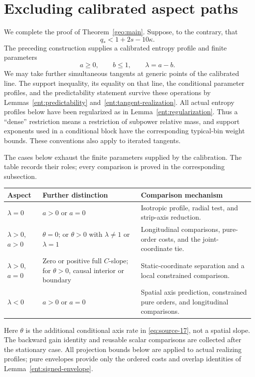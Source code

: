 \section{Excluding calibrated aspect paths}\label{sec:aspect}

We complete the proof of Theorem~\ref{geo:main}. Suppose, to the contrary, that
\begin{equation}\label{asp:contradiction}
q_*<1+2s-10\kappa.
\end{equation}
The preceding construction supplies a calibrated entropy profile and finite
parameters
\[
a\ge0,\qquad b\le1,\qquad \lambda=a-b.
\]
We may take further simultaneous tangents at generic points of the calibrated
line. The support inequality, its equality on that line, the conditional
parameter profiles, and the predictability statement survive these operations
by Lemmas~\ref{ent:predictability} and~\ref{ent:tangent-realization}.
All actual entropy profiles below have been regularized as in
Lemma~\ref{ent:regularization}.
Thus a ``dense'' restriction means a restriction of subpower relative mass,
and support exponents used in a conditional block have the corresponding
typical-bin weight bounds. These conventions also apply to iterated tangents.

The cases below exhaust the finite parameters supplied by the
calibration.  The table records their roles; every comparison is
proved in the corresponding subsection.
\begin{center}
\small
\begin{tabular}{@{}p{.23\linewidth}p{.30\linewidth}p{.40\linewidth}@{}}
\toprule
Aspect & Further distinction & Comparison mechanism \\
\midrule
$\lambda=0$ & $a>0$ or $a=0$ & Isotropic profile, radial test,
and strip-axis reduction. \\
$\lambda>0$, $a>0$ & $\theta=0$; or $\theta>0$ with
$\lambda\ne1$ or $\lambda=1$ & Longitudinal comparisons,
pure-order costs, and the joint-coordinate tie. \\
$\lambda>0$, $a=0$ & Zero or positive full $C$-slope; for
$\theta>0$, causal interior or boundary & Static-coordinate separation and
a local constrained comparison. \\
$\lambda<0$ & $a>0$ or $a=0$ & Spatial axis prediction,
constrained pure orders, and longitudinal comparisons. \\
\bottomrule
\end{tabular}
\end{center}
Here $\theta$ is the additional conditional axis rate in
\eqref{eq:source-17}, not a spatial slope.  The backward gain
identity and reusable scalar comparisons are collected after the
stationary case.  All projection bounds below are applied to actual
realizing profiles; pure envelopes provide only the ordered costs
and overlap identities of Lemma~\ref{ent:signed-envelope}.

